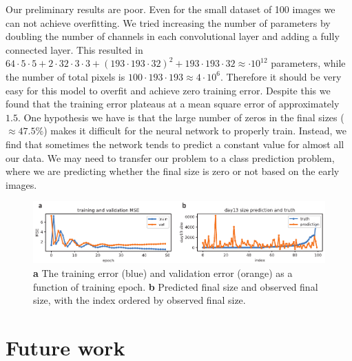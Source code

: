 \documentclass[10pt,twocolumn,letterpaper]{article}
\begin{document}
Our preliminary results are poor.  Even for the small dataset of 100 images we can not achieve overfitting.   We tried increasing the number of parameters by doubling the number of channels in each convolutional layer and adding a fully connected layer.  This resulted in $64 \cdot 5 \cdot 5 + 2 \cdot 32 \cdot 3 \cdot 3 + (193 \cdot 193 \cdot 32)^2 + 193 \cdot 193 \cdot 32 \approx \cdot 10^{12}$ parameters, while the number of total pixels is $100 \cdot 193 \cdot 193 \approx 4 \cdot 10^{6}$.  Therefore it should be very easy for this model to overfit and achieve zero training error.  Despite this we found that the training error plateaus at a mean square error of approximately $1.5$.  One hypothesis we have is that the large number of zeros in the final sizes ($\approx 47.5 \%$) makes it difficult for the neural network to properly train.  Instead, we find that sometimes the network tends to predict a constant value for almost all our data.  We may need to transfer our problem to a class prediction problem, where we are predicting whether the final size is zero or not based on the early images.  

\begin{figure}[t!]
\begin{center}
 \includegraphics[width=0.8\linewidth]{figures/error_vs_epoch_and_validation_predictions_vs_observed.pdf}
\end{center}
   \caption{\textbf{a} The training error (blue) and validation error (orange) as a function of training epoch.  \textbf{b} Predicted final size and observed final size, with the index ordered by observed final size. }
\label{results}
\end{figure}


\section{Future work}
\end{document}
